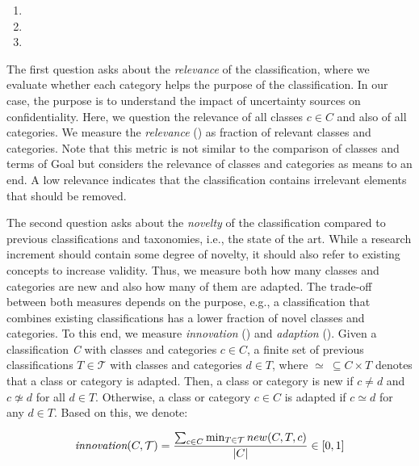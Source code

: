 \begin{enumerate}[leftmargin=\GQMquestionsIndent]
  \item[\question{3}{1}] \textGiiiQi 
  \item[\question{3}{2}] \textGiiiQii
  \item[\question{3}{3}] \textGiiiQiii
\end{enumerate}

\label{gqm:text:q:3:1} 
The first question  asks about the \emph{relevance} of the classification, where we evaluate whether each category helps the purpose of the classification.
In our case, the purpose is to understand the impact of uncertainty sources on confidentiality.
Here, we question the relevance of all classes $c \in C$ and also of all categories.
We measure the \emph{relevance} (\label{gqm:text:m:3:1:1}) as fraction of relevant classes and categories.
Note that this metric is not similar to the comparison of classes and terms of Goal  but considers the relevance of classes and categories as means to an end.
A low relevance indicates that the classification contains irrelevant elements that should be removed.

\label{gqm:text:q:3:2}
The second question  asks about the \emph{novelty} of the classification compared to previous classifications and taxonomies, i.e., the state of the art.
While a research increment should contain some degree of novelty, it should also refer to existing concepts to increase validity.
Thus, we measure both how many classes and categories are new and also how many of them are adapted.
The trade-off between both measures depends on the purpose, e.g., a classification that combines existing classifications has a lower fraction of novel classes and categories.
To this end, we measure \emph{innovation} (\label{gqm:text:m:3:2:1}) and \emph{adaption} (\label{gqm:text:m:3:2:2}).
Given a classification \emph{C} with classes and categories $c \in C$, a finite set of previous classifications $T\in \mathcal{T}$ with classes and categories $d\in T$, where $\simeq\ \subseteq C \times T$ denotes that a class or category is adapted.
Then, a class or category is new if $c \neq d$ and $c \not\simeq d$ for all $d\in T$.
Otherwise, a class or category $c\in C$ is adapted if $c \simeq d$ for any $d\in T$.
Based on this, we denote:

\begin{equation*}
  \emph{innovation}(C,\mathcal{T}) = \frac{\sum\nolimits_{c\in C} \min_{T\in\mathcal{T}} new(C,T,c) }{\lvert C \rvert} \in [0,1]
\end{equation*}

